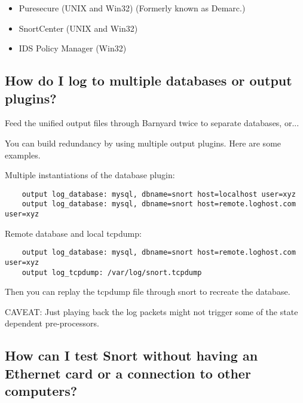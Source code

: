 \documentclass{article}
\begin{document}
\begin{enumerate}
\begin{itemize}

     \item Puresecure (UNIX and Win32) (Formerly known as Demarc.)


      \item SnortCenter (UNIX and Win32)


      \item IDS Policy Manager (Win32)

 \end{itemize}
 \end{enumerate}

\subsection{How do I log to multiple databases or output plugins?}

Feed the unified output files through Barnyard twice to separate databases,
or...

You can build redundancy by using multiple output plugins. Here are some
examples.

Multiple instantiations of the database plugin:
\begin{verbatim}
    output log_database: mysql, dbname=snort host=localhost user=xyz
    output log_database: mysql, dbname=snort host=remote.loghost.com user=xyz
\end{verbatim}
Remote database and local tcpdump:
\begin{verbatim}
    output log_database: mysql, dbname=snort host=remote.loghost.com user=xyz
    output log_tcpdump: /var/log/snort.tcpdump
\end{verbatim}
Then you can replay the tcpdump file through snort to recreate the database.

CAVEAT: Just playing back the log packets might not trigger some of the state
dependent pre-processors.

\subsection{How can I test Snort without having an Ethernet card or a connection to other computers?  }
\end{document}
